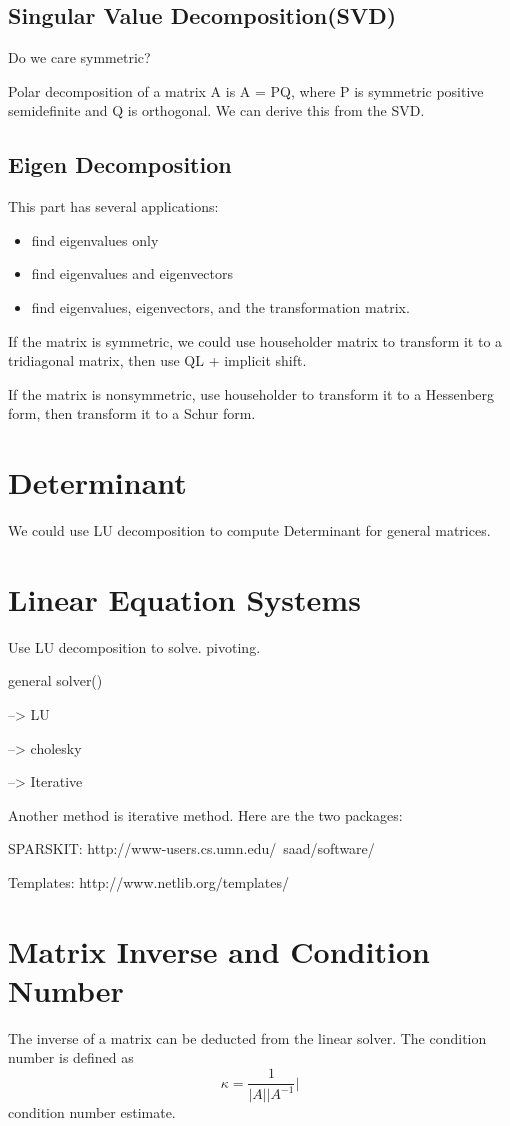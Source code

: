 \subsection{Singular Value Decomposition(SVD)}
Do we care symmetric?

Polar decomposition of a matrix A is A = PQ, where P is symmetric positive semidefinite and Q is orthogonal. We can derive this from the SVD.

\subsection{Eigen Decomposition}
This part has several applications:
\begin{itemize}
\item find eigenvalues only
\item find eigenvalues and eigenvectors
\item find eigenvalues, eigenvectors, and the transformation matrix.
\end{itemize}
If the matrix is symmetric, we could use householder matrix to transform it to a tridiagonal matrix, then use QL + implicit shift.

If the matrix is nonsymmetric, use householder to transform it to a Hessenberg form, then transform it to a Schur form.

\section{Determinant}
We could use LU decomposition to compute Determinant for general matrices.

\section{Linear Equation Systems}
Use LU decomposition to solve. pivoting.

general solver()

--> LU

--> cholesky

--> Iterative

Another method is iterative method.
Here are the two packages:

SPARSKIT: http://www-users.cs.umn.edu/~saad/software/

Templates: http://www.netlib.org/templates/
\section{Matrix Inverse and Condition Number}
The inverse of a matrix can be deducted from the linear solver.
The condition number is defined as \[\kappa = {\frac{1}{|A||A^{-1}}|}\]
condition number estimate.


